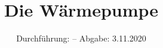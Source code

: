 

\subject{VERSUCH D206}
\title{Die Wärmepumpe}
\date{%
  Durchführung: --
  \hspace{3em}
  Abgabe: 3.11.2020
}



\maketitle
\thispagestyle{empty}
\tableofcontents
\newpage






\printbibliography{}


